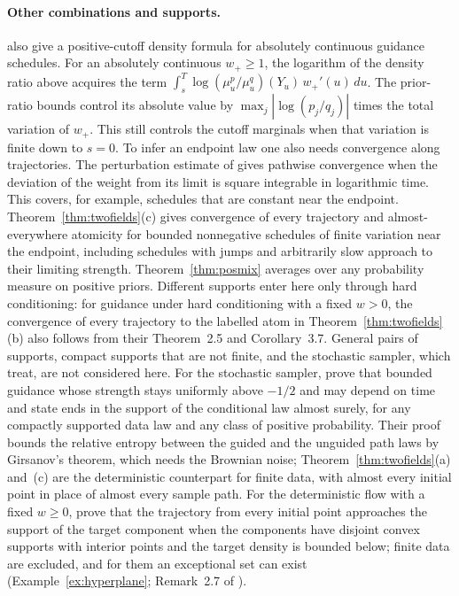 \documentclass{article} %
\makeatletter
\newif\ificlr
\newcommand{\placeblock}[1]{\ificlr\@nameuse{moved@#1}\fi}
\theoremstyle{plain}
\theoremstyle{definition}
\theoremstyle{remark}
\makeatother
\begin{document}
\paragraph{Other combinations and supports.}
\citet[Theorem~4.3]{jiang2026guidance} also give a positive-cutoff density formula for
absolutely continuous guidance schedules. For an absolutely continuous $w_+\ge1$, the
logarithm of the density ratio above acquires the term
$\int_s^T \log(\mu^p_u/\mu^q_u)(Y_u)\,w_+'(u)\,du$. The prior-ratio bounds control its absolute
value by $\max_j|\log(p_j/q_j)|$ times the total variation of $w_+$. This still controls
the cutoff marginals when that variation is finite down to $s=0$. To infer an endpoint law
one also needs convergence along trajectories. The perturbation estimate of
\citet[Proposition~3.1 and Remark~3.2]{liu2026geometric} gives pathwise convergence when the
deviation of the weight from its limit is square integrable in logarithmic time. This covers,
for example, schedules that are constant near the endpoint. Theorem~\ref{thm:twofields}(c) gives
convergence of every trajectory and almost-everywhere atomicity for bounded nonnegative
schedules of finite variation near the endpoint, including schedules with jumps and arbitrarily
slow approach to their limiting strength. Theorem~\ref{thm:posmix} averages over any probability
measure on positive priors. Different supports enter here only
through hard conditioning: for guidance under hard conditioning with a fixed $w>0$, the convergence of every
trajectory to the labelled atom in Theorem~\ref{thm:twofields}(b) also follows from their
Theorem~2.5 and Corollary~3.7. General pairs of supports, compact supports that are not finite, and
the stochastic sampler, which \citet{liu2026geometric} treat, are not considered here. For the
stochastic sampler, \citet[Theorem~3]{azangulov2026adaptive} prove that bounded guidance whose
strength stays uniformly above $-1/2$ and may depend on time and state ends in the support of the conditional law almost
surely, for any compactly supported data law and any class of positive probability. Their proof
bounds the relative entropy between the
guided and the unguided path laws by Girsanov's theorem, which needs the Brownian noise;
Theorem~\ref{thm:twofields}(a) and~(c) are the deterministic counterpart
for finite data, with almost every initial point in place of almost every sample path. For the
deterministic flow with a fixed $w\ge0$, \citet[Theorem~3.1]{cao2026robustness} prove that the
trajectory from every initial point approaches the support of the target component when the
components have disjoint convex supports with interior points and the target density is bounded
below; finite data are excluded, and for them an exceptional set can exist
(Example~\ref{ex:hyperplane}; Remark~2.7 of \citealp{liu2026geometric}).\placeblock{caiflow}
\end{document}
